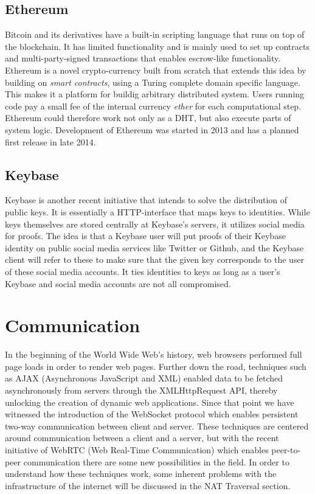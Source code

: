\subsection{Ethereum}
Bitcoin and its derivatives have a built-in scripting language that runs on top of the blockchain. It has limited functionality and is mainly used to set up contracts and multi-party-signed transactions that enables escrow-like functionality. Ethereum\cite{Ethereum:Online} is a novel crypto-currency built from scratch that extends this idea by building on \emph{smart contracts}, using a Turing complete domain specific language. This makes it a platform for buildig arbitrary distributed system. Users running code pay a small fee of the internal currency \emph{ether} for each computational step. Ethereum could therefore work not only as a DHT, but also execute parts of system logic. Development of Ethereum was started in 2013 and has a planned first release in late 2014.

\subsection{Keybase}
Keybase \cite{Keybase:Online} is another recent initiative that intends to solve the distribution of public keys. It is essentially a HTTP-interface that maps keys to identities. While keys themselves are stored centrally at Keybase's servers, it utilizes social media for proofs. The idea is that a Keybase user will put proofs of their Keybase identity on public social media services like Twitter or Github, and the Keybase client will refer to these to make sure that the given key corresponds to the user of these social media accounts. It ties identities to keys as long as a user's Keybase and social media accounts are not all compromised.


\section{Communication}
\label{sec:communication}
In the beginning of the World Wide Web's history, web browsers performed full page loads in order to render web pages. Further down the road, techniques such as AJAX (Asynchronous JavaScript and XML) enabled data to be fetched asynchronously from servers through the XMLHttpRequest API, thereby unlocking the creation of dynamic web applications. Since that point we have witnessed the introduction of the WebSocket protocol which enables persistent two-way communication between client and server. These techniques are centered around communication between a client and a server, but with the recent initiative of WebRTC (Web Real-Time Communication) which enables peer-to-peer communication there are some new possibilities in the field. In order to understand how these techniques work, some inherent problems with the infrastructure of the internet will be discussed in the NAT Traversal section.

